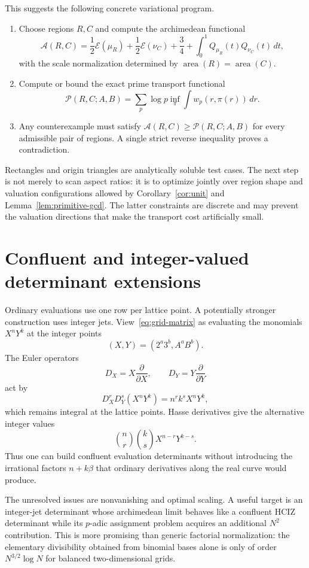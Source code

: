 \documentclass[11pt]{article}
\theoremstyle{definition}
\begin{document}
This suggests the following concrete variational program.
\begin{enumerate}
\item Choose regions $R,C$ and compute the archimedean functional
\[
 \mathcal A(R,C)=\frac12\mathcal E(\mu_R)
 +\frac12\mathcal E(\nu_C)+\frac34
 +\int_0^1Q_{\mu_R}(t)Q_{\nu_C}(t)\,dt,
\]
with the scale normalization determined by $\operatorname{area}(R)
=\operatorname{area}(C)$.
\item Compute or bound the exact prime transport functional
\[
 \mathcal P(R,C;A,B)=
 \sum_p\log p\inf_{\pi}
 \int w_p(r,\pi(r))\,dr.
\]
\item Any counterexample must satisfy
$\mathcal A(R,C)\ge\mathcal P(R,C;A,B)$ for every admissible pair of regions.
A single strict reverse inequality proves a contradiction.
\end{enumerate}

Rectangles and origin triangles are analytically soluble test cases.  The next
step is not merely to scan aspect ratios: it is to optimize jointly over region
shape and valuation configurations allowed by
Corollary~\ref{cor:unit} and Lemma~\ref{lem:primitive-gcd}.  The latter
constraints are discrete and may prevent the valuation directions that make
the transport cost artificially small.

\section{Confluent and integer-valued determinant extensions}

Ordinary evaluations use one row per lattice point.  A potentially stronger
construction uses integer jets.  View~\eqref{eq:grid-matrix} as evaluating the
monomials $X^nY^k$ at the integer points
\[
 (X,Y)=(2^a3^b,A^aB^b).
\]
The Euler operators
\[
 D_X=X\frac{\partial}{\partial X},\qquad
 D_Y=Y\frac{\partial}{\partial Y}
\]
act by
\[
 D_X^rD_Y^s(X^nY^k)=n^rk^sX^nY^k,
\]
which remains integral at the lattice points.  Hasse derivatives give the
alternative integer values
\[
 \binom nr\binom ksX^{n-r}Y^{k-s}.
\]
Thus one can build confluent evaluation determinants without introducing the
irrational factors $n+k\beta$ that ordinary derivatives along the real curve
would produce.

The unresolved issues are nonvanishing and optimal scaling.  A useful target
is an integer-jet determinant whose archimedean limit behaves like a confluent
HCIZ determinant while its $p$-adic assignment problem acquires an additional
$N^2$ contribution.  This is more promising than generic factorial
normalization: the elementary divisibility obtained from binomial bases alone
is only of order $N^{3/2}\log N$ for balanced two-dimensional grids.
\end{document}
